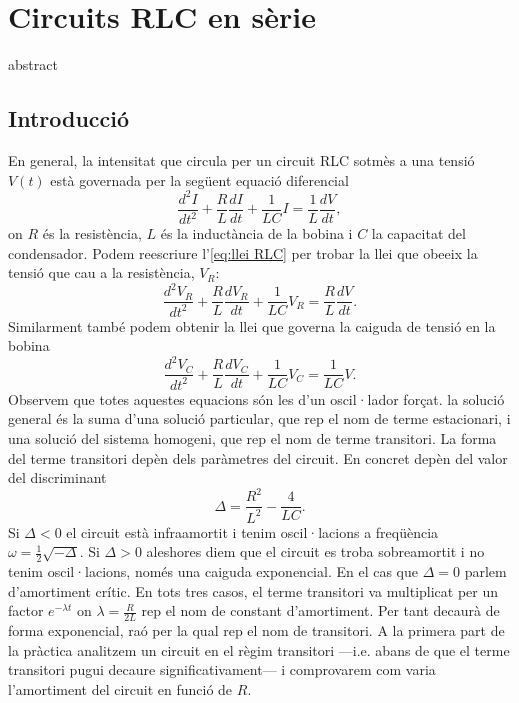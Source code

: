 \chapter{Circuits RLC en sèrie}

\begin{resum}
abstract
\end{resum}

\section{Introducció}
En general, la intensitat que circula per un circuit RLC sotmès a una tensió \( V(t) \) està governada per la següent equació diferencial
\begin{equation} \label{eq:llei RLC}
	\frac{d^2 I}{dt^2} + \frac{R}{L} \frac{dI}{dt} + \frac{1}{LC}I = \frac{1}{L}\frac{dV}{dt},
\end{equation}
on \( R \) és la resistència, \( L \) és la inductància de la bobina i \( C \) la capacitat del condensador. Podem reescriure l'\cref{eq:llei RLC} per trobar la llei que obeeix la tensió que cau a la resistència, \( V_R \):
\begin{equation} \label{eq:llei VR}
	\frac{d^2V_R}{dt^2} + \frac{R}{L}\frac{dV_R}{dt} + \frac{1}{LC}V_R = \frac{R}{L}\frac{dV}{dt}.
\end{equation}
Similarment també podem obtenir la llei que governa la caiguda de tensió en la bobina
\begin{equation} \label{eq:llei VC}
	\frac{d^2V_C}{dt^2} + \frac{R}{L}\frac{dV_C}{dt} + \frac{1}{LC}V_C = \frac{1}{LC}V.
\end{equation}
Observem que totes aquestes equacions són les d'un oscil·lador forçat. la solució general és la suma d'una solució particular, que rep el nom de terme estacionari, i una solució del sistema homogeni, que rep el nom de terme transitori. La forma del terme transitori depèn dels paràmetres del circuit. En concret depèn del valor del discriminant
\begin{equation*}
	\Delta = \frac{R^2}{L^2} - \frac{4}{LC}.
\end{equation*}
Si \( \Delta < 0 \) el circuit està infraamortit i tenim oscil·lacions a freqüència \( \omega = \frac{1}{2}\sqrt{-\Delta} \). Si \( \Delta > 0 \) aleshores diem que el circuit es troba sobreamortit i no tenim oscil·lacions, només una caiguda exponencial. En el cas que \( \Delta = 0 \) parlem d'amortiment crític. En tots tres casos, el terme transitori va multiplicat per un factor \( e^{-\lambda t} \) on \( \lambda = \frac{R}{2L} \) rep el nom de constant d'amortiment. Per tant decaurà de forma exponencial, raó per la qual rep el nom de transitori. A la primera part de la pràctica analitzem un circuit en el règim transitori ---i.e. abans de que el terme transitori pugui decaure significativament--- i comprovarem com varia l'amortiment del circuit en funció de \( R \).  


